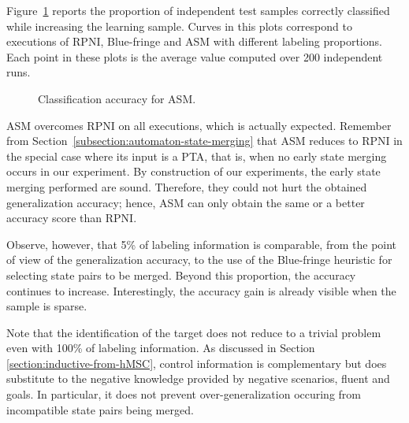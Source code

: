 Figure~\ref{image:evaluation-asm-accuracy} reports the proportion of independent test samples correctly classified while increasing the learning sample. Curves in this plots correspond to executions of RPNI, Blue-fringe and ASM with different labeling proportions. Each point in these plots is the average value computed over 200 independent runs. 

\begin{figure}
\begin{center}
\caption{Classification accuracy for ASM\label{image:evaluation-asm-accuracy}.}
\end{center}
\end{figure}

ASM overcomes RPNI on all executions, which is actually expected. Remember from Section~\ref{subsection:automaton-state-merging} that ASM reduces to RPNI in the special case where its input is a PTA, that is, when no early state merging occurs in our experiment. By construction of our experiments, the early state merging performed are sound. Therefore, they could not hurt the obtained generalization accuracy; hence, ASM can only obtain the same or a better accuracy score than RPNI.

Observe, however, that 5\% of labeling information is comparable, from the point of view of the generalization accuracy, to the use of the Blue-fringe heuristic for selecting state pairs to be merged. Beyond this proportion, the accuracy continues to increase. Interestingly, the accuracy gain is already visible when the sample is sparse.

Note that the identification of the target does not reduce to a trivial problem even with 100\% of labeling information. As discussed in Section \ref{section:inductive-from-hMSC}, control information is complementary but does substitute to the negative knowledge provided by negative scenarios, fluent and goals. In particular, it does not prevent over-generalization occuring from incompatible state pairs being merged. 
